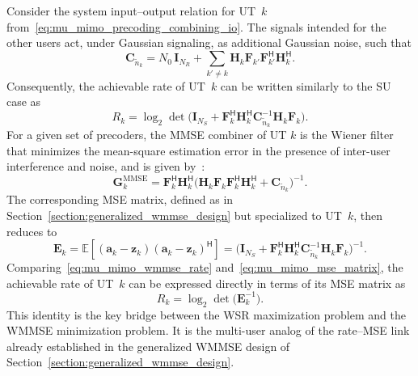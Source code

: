 Consider the system input--output relation for \ac{UT}~$k$ from~\eqref{eq:mu_mimo_precoding_combining_io}.
The signals intended for the other users act, under Gaussian signaling, as additional Gaussian noise, such that
\begin{equation}
\label{eq:effective_noise_covariance}
    \mathbf{C}_{\tilde{n}_k} = N_0 \, \mathbf{I}_{N_R} + \sum_{k' \neq k} \mathbf{H}_k \mathbf{F}_{k'} \mathbf{F}_{k'}^{\mathsf{H}} \mathbf{H}_k^{\mathsf{H}}.
\end{equation}
Consequently, the achievable rate of \ac{UT}~$k$ can be written similarly to the \ac{SU} case as
\begin{equation}
\label{eq:mu_mimo_wmmse_rate}
    R_k = \log_2 \det\!\Big(\mathbf{I}_{N_S} + \mathbf{F}_k^{\mathsf{H}} \mathbf{H}_k^{\mathsf{H}} \mathbf{C}_{\tilde{n}_k}^{-1} \mathbf{H}_k \mathbf{F}_k\Big).
\end{equation}
For a given set of precoders, the \acf{MMSE} combiner of \ac{UT} $k$ is the Wiener filter that minimizes the mean-square estimation error in the presence of inter-user interference and noise, and is given by~\cite{MMSE_receive_filter}:
\begin{equation}
\label{eq:mu_mimo_mmse_combiner}
    \mathbf{G}_k^{\mathrm{MMSE}} = \mathbf{F}_k^{\mathsf{H}} \mathbf{H}_k^{\mathsf{H}} \big(\mathbf{H}_k \mathbf{F}_k \mathbf{F}_k^{\mathsf{H}} \mathbf{H}_k^{\mathsf{H}} + \mathbf{C}_{\tilde{n}_k}\big)^{-1}.
\end{equation}
The corresponding \ac{MSE} matrix, defined as in Section~\ref{section:generalized_wmmse_design} but specialized to \ac{UT}~$k$, then reduces to~\cite{WMMSE_precoding_ref15}
\begin{equation}
\label{eq:mu_mimo_mse_matrix}
    \mathbf{E}_k 
    = \mathbb{E}\!\left[(\mathbf{a}_k - \mathbf{z}_k)(\mathbf{a}_k - \mathbf{z}_k)^{\mathsf{H}}\right]
    = \big(\mathbf{I}_{N_S} + \mathbf{F}_k^{\mathsf{H}} \mathbf{H}_k^{\mathsf{H}} \mathbf{C}_{\tilde{n}_k}^{-1} \mathbf{H}_k \mathbf{F}_k\big)^{-1}.
\end{equation}
Comparing~\eqref{eq:mu_mimo_wmmse_rate} and~\eqref{eq:mu_mimo_mse_matrix}, the achievable rate of \ac{UT}~$k$ can be expressed directly in terms of its \ac{MSE} matrix as~\cite{WMMSE_precoding}
\begin{equation}
\label{eq:mu_mimo_rate_mse_relation}
    R_k = \log_2 \det\!\big(\mathbf{E}_k^{-1}\big).
\end{equation}
This identity is the key bridge between the \ac{WSR} maximization problem and the \acs{WMMSE} minimization problem.
It is the multi-user analog of the rate--MSE link already established in the generalized \ac{WMMSE} design of Section~\ref{section:generalized_wmmse_design}.
\medskip

